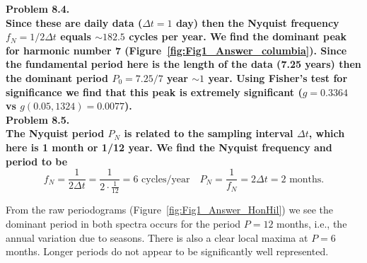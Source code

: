 \noindent
\bf{Problem 8.4.} \\

Since these are daily data ($\Delta t = 1$ day) then the Nyquist frequency $f_N = 1/2\Delta t$ equals
$\sim 182.5$ cycles per year.  We find the dominant peak for harmonic number 7 (Figure~\ref{fig:Fig1_Answer_columbia}).
Since the fundamental period here
is the length of the data (7.25 years) then the dominant period $P_0 = 7.25/7$ year $\sim 1$ year. Using Fisher's
test for significance we find that this peak is extremely significant ($g = 0.3364$ vs $g(0.05,1324) = 0.0077$). \\


\noindent
\bf{Problem 8.5.} \\

The Nyquist period $P_N$ is related to the sampling interval $\Delta t$, which here is 1 month or 1/12 year.
We find the Nyquist frequency and period to be
$$
f_N = \frac{1}{2 \Delta t} = \frac{1}{2 \cdot \frac{1}{12}} = 6 \mbox{ cycles/year}
\quad P_N = \frac{1}{f_N} = 2\Delta t = 2 \mbox{ months.}
$$

From the raw periodograms (Figure~\ref{fig:Fig1_Answer_HonHil}) we see the dominant period in both spectra occurs for the period $P = 12$ months,
i.e., the annual variation due to seasons.  There is also a clear local maxima at $P = 6$ months.  Longer periods
do not appear to be significantly well represented.


